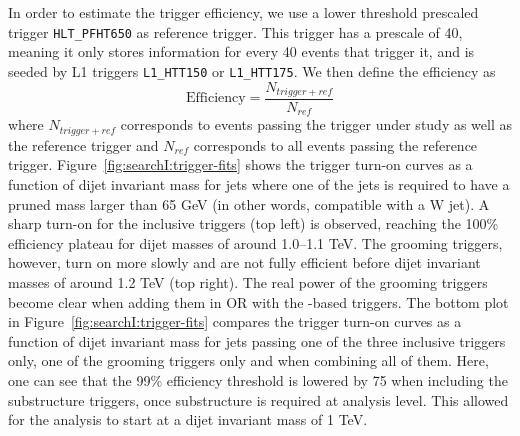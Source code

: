 In order to estimate the trigger efficiency, we use a lower threshold prescaled \HT{} trigger \texttt{HLT\_PFHT650} as reference trigger. This trigger has a prescale of 40, meaning it only stores information for every 40 events that trigger it, and is seeded by L1 triggers \texttt{L1\_HTT150} or \texttt{L1\_HTT175}. We then define the efficiency as
\begin{equation*}
\textrm{Efficiency} = \frac{N_{trigger+ref}}{N_{ref}}  
\end{equation*}
where $N_{trigger+ref}$ corresponds to events passing the trigger under study as well as the reference trigger and $N_{ref}$ corresponds to all events passing the reference trigger. Figure~\ref{fig:searchI:trigger-fits} shows the trigger turn-on curves as a function of dijet invariant mass for jets where one of the jets is required to have a pruned mass larger than 65 GeV (in other words, compatible with a W jet). A sharp turn-on for the inclusive triggers (top left) is observed, reaching the 100\% efficiency plateau for dijet masses of around 1.0--1.1 TeV. The grooming triggers, however, turn on more slowly and are not fully efficient before dijet invariant masses of around 1.2 TeV (top right). The real power of the grooming triggers become clear when adding them in OR with the \HT-based triggers. The bottom plot in Figure~\ref{fig:searchI:trigger-fits} compares the trigger turn-on curves as a function of dijet invariant mass for jets passing one of the three inclusive triggers only, one of the grooming triggers only and when combining all of them. Here, one can see that the 99\% efficiency threshold is lowered by 75 \GeV when including the substructure triggers, once substructure is required at analysis level.
This allowed for the analysis to start at a dijet invariant mass of 1 TeV.

